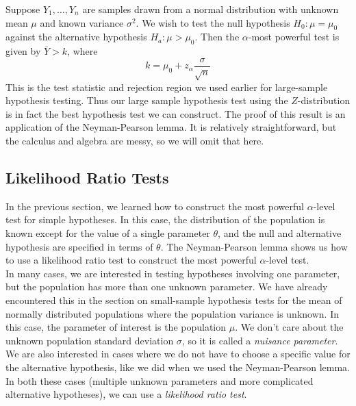 \documentclass[notes.tex]{subfiles}
\begin{document}
\begin{example}
Suppose $Y_1, \dots, Y_n$ are samples drawn from a normal distribution with unknown mean $\mu$ and known variance $\sigma^2$. We wish to test the null hypothesis $H_0: \mu = \mu_0$ against the alternative hypothesis $H_a: \mu > \mu_0$. Then the $\alpha$-most powerful test is given by $\bar{Y} > k$, where
\[
k = \mu_0 + z_\alpha\frac{\sigma}{\sqrt{n}}
\]
This is the test statistic and rejection region we used earlier for large-sample hypothesis testing. Thus our large sample hypothesis test using the $Z$-distribution is in fact the best hypothesis test we can construct. The proof of this result is an application of the Neyman-Pearson lemma. It is relatively straightforward, but the calculus and algebra are messy, so we will omit that here.
\end{example}

\subsection{Likelihood Ratio Tests}
In the previous section, we learned how to construct the most powerful $\alpha$-level test for simple hypotheses. In this case, the distribution of the population is known except for the value of a single parameter $\theta$, and the null and alternative hypothesis are specified in terms of $\theta$. The Neyman-Pearson lemma shows us how to use a likelihood ratio test to construct the most powerful $\alpha$-level test.\\

In many cases, we are interested in testing hypotheses involving one parameter, but the population has more than one unknown parameter. We have already encountered this in the section on small-sample hypothesis tests for the mean of normally distributed populations where the population variance is unknown. In this case, the parameter of interest is the population $\mu$. We don't care about the unknown population standard deviation $\sigma$, so it is called a \emph{nuisance parameter}. We are also interested in cases where we do not have to choose a specific value for the alternative hypothesis, like we did when we used the Neyman-Pearson lemma. In both these cases (multiple unknown parameters and more complicated alternative hypotheses), we can use a \emph{likelihood ratio test}.\\
\end{document}
